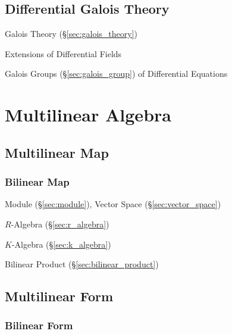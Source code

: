 \subsection{Differential Galois Theory}\label{sec:differential_galois}

Galois Theory (\S\ref{sec:galois_theory})

Extensions of Differential Fields

Galois Groups (\S\ref{sec:galois_group}) of Differential Equations



\section{Multilinear Algebra}\label{sec:multilinear_algebra}

\subsection{Multilinear Map}\label{sec:multilinear_map}

\subsubsection{Bilinear Map}\label{sec:bilinear_map}

Module (\S\ref{sec:module}), Vector Space (\S\ref{sec:vector_space})

$R$-Algebra (\S\ref{sec:r_algebra})

$K$-Algebra (\S\ref{sec:k_algebra})

Bilinear Product (\S\ref{sec:bilinear_product})



\subsection{Multilinear Form}\label{sec:multilinear_form}

\subsubsection{Bilinear Form}\label{sec:bilinear_form}

